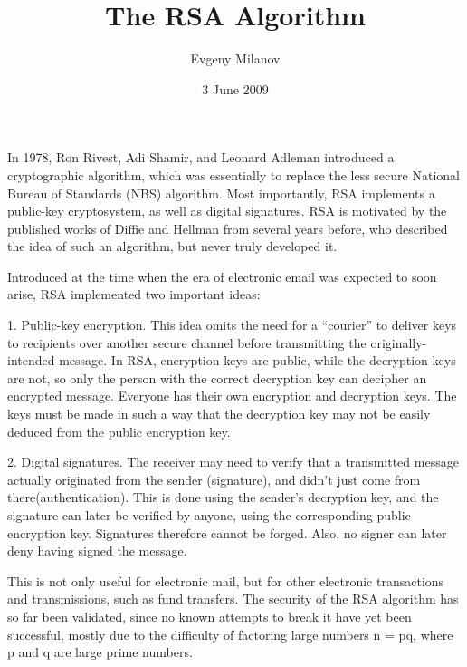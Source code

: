 \documentclass{article}
\title{The RSA Algorithm}
\author{Evgeny Milanov}
\date{3 June 2009}
\begin{document}
\maketitle

In 1978, Ron Rivest, Adi Shamir, and Leonard Adleman introduced a cryptographic algorithm, which was essentially to replace the less secure National Bureau of Standards (NBS) algorithm. Most importantly, RSA implements a public-key cryptosystem, as well as digital signatures. RSA is motivated by the published works of Diﬃe and Hellman from several years before, who described the idea of such an algorithm, but never truly developed it.
\\\par\setlength\parindent{2em}

Introduced at the time when the era of electronic email was expected to soon arise, RSA implemented two important ideas:
\\\par\setlength\parindent{2em}

1. Public-key encryption. This idea omits the need for a “courier” to deliver keys to recipients over another secure channel before transmitting the originally-intended message. In RSA, encryption keys are public, while the decryption keys are not, so only the person with the correct decryption key can decipher an encrypted message. Everyone has their own encryption and decryption keys. The keys must be made in such a way that the decryption key may not be easily deduced from the public encryption key.
\\\par\setlength\parindent{2em}

2. Digital signatures. The receiver may need to verify that a transmitted message actually originated from the sender (signature), and didn’t just come from there(authentication). This is done using the sender’s decryption key, and the signature can later be veriﬁed by anyone, using the corresponding public encryption key. Signatures therefore cannot be forged. Also, no signer can later deny having signed the message.
\\\par\setlength\parindent{2em}

This is not only useful for electronic mail, but for other electronic transactions and transmissions, such as fund transfers. The security of the RSA algorithm has so far been validated, since no known attempts to break it have yet been successful, mostly due to the diﬃculty of factoring large numbers n = pq, where p and q are large prime numbers.
\end{document}
